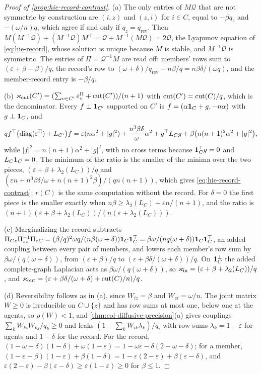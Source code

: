 \begin{proof}[Proof of \cref{prop:hie-record-contrast}]
(a) The only entries of $M\mathcal Q$ that are not symmetric by construction are $(i,z)$ and $(z,i)$ for $i\in C$, equal to $-\beta q_z$ and $-(\omega/n)q$, which agree if and only if $q_z=q_{\mathrm{rev}}$. Then $M(M^{-1}\mathcal Q)+(M^{-1}\mathcal Q)M^\top=\mathcal Q+M^{-1}(M\mathcal Q)=2\mathcal Q$, the Lyapunov equation of \eqref{eq:hie-record}, whose solution is unique because $M$ is stable, and $M^{-1}\mathcal Q$ is symmetric. The entries of $\Pi=\mathcal Q^{-1}M$ are read off: members' rows sum to $(\varepsilon+\beta-\beta)/q$, the record's row to $(\omega+\delta)/q_{\mathrm{rev}}-n\beta/q=n\beta\delta/(\omega q)$, and the member-record entry is $-\beta/q$.

(b) $\varkappa_{\mathrm{out}}(C')=(\sum_{v\in C'}\varepsilon^\Pi_v+\operatorname{cut}(C'))/(n+1)$ with $\operatorname{cut}(C')=\operatorname{cut}(C)/q$, which is the denominator. Every $f\perp\mathbf{1}_{C'}$ supported on $C'$ is $f=(\alpha\mathbf{1}_C+g,-n\alpha)$ with $g\perp\mathbf{1}_C$, and
\[
qf^\top\bigl(\operatorname{diag}(\varepsilon^\Pi)+L_{C'}\bigr)f=\varepsilon(n\alpha^2+\lvert g\rvert^2)+\frac{n^3\beta\delta}\omega\alpha^2+g^\top L_Cg+\beta\bigl(n(n+1)^2\alpha^2+\lvert g\rvert^2\bigr),
\]
while $\lvert f\rvert^2=n(n+1)\alpha^2+\lvert g\rvert^2$, with no cross terms because $\mathbf{1}_C^\top g=0$ and $L_C\mathbf{1}_C=0$. The minimum of the ratio is the smaller of the minima over the two pieces, $(\varepsilon+\beta+\lambda_2(L_C))/q$ and $(\varepsilon n+n^3\beta\delta/\omega+n(n+1)^2\beta)/(qn(n+1))$, which gives \eqref{eq:hie-record-contrast}; $r(C)$ is the same computation without the record. For $\delta=0$ the first piece is the smaller exactly when $n\beta\ge\lambda_2(L_C)+\varepsilon n/(n+1)$, and the ratio is $(n+1)(\varepsilon+\beta+\lambda_2(L_C))/(n(\varepsilon+\lambda_2(L_C)))$.

(c) Marginalizing the record subtracts $\Pi_{Cz}\Pi_{zz}^{-1}\Pi_{zC}=(\beta/q)^2\omega q/(n\beta(\omega+\delta))\mathbf{1}_C\mathbf{1}_C^\top=\beta\omega/(nq(\omega+\delta))\mathbf{1}_C\mathbf{1}_C^\top$, an added coupling between every pair of members, and lowers each member's row sum by $\beta\omega/(q(\omega+\delta))$, from $(\varepsilon+\beta)/q$ to $(\varepsilon+\beta\delta/(\omega+\delta))/q$. On $\mathbf{1}_C^\perp$ the added complete-graph Laplacian acts as $\beta\omega/(q(\omega+\delta))$, so $\varkappa_{\mathrm{in}}=(\varepsilon+\beta+\lambda_2(L_C))/q$, and $\varkappa_{\mathrm{out}}=(\varepsilon+\beta\delta/(\omega+\delta)+\operatorname{cut}(C)/n)/q$.

(d) Reversibility follows as in (a), since $W_{iz}=\beta$ and $W_{zi}=\omega/n$. The joint matrix $W\ge0$ is irreducible on $C\cup\{z\}$ and has row sums at most one, below one at the agents, so $\rho(W)<1$, and \cref{thm:col-diffusive-precision}(a) gives couplings $\sum_kW_{ki}W_{kj}/q_k\ge0$ and leaks $(1-\sum_kW_{ik}\lambda_k)/q_i$ with row sums $\lambda_k=1-\varepsilon$ for agents and $1-\delta$ for the record. For the record, $(1-\omega-\delta)(1-\delta)+\omega(1-\varepsilon)=1-\omega\varepsilon-\delta(2-\omega-\delta)$; for a member, $(1-\varepsilon-\beta)(1-\varepsilon)+\beta(1-\delta)=1-\varepsilon(2-\varepsilon)+\beta(\varepsilon-\delta)$, and $\varepsilon(2-\varepsilon)-\beta(\varepsilon-\delta)\ge\varepsilon(1-\varepsilon)\ge0$ for $\beta\le1$.
\end{proof}

